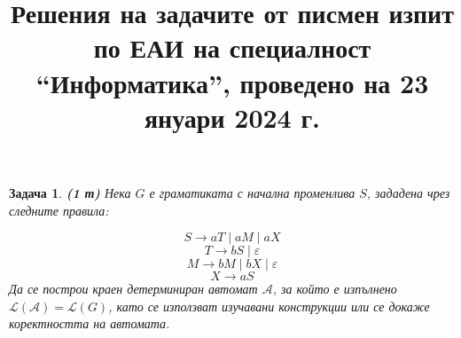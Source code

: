 \documentclass{article}
\newtheorem{problem}{Задача}
\theoremstyle{definition}
\begin{document}
\title{Решения на задачите от писмен изпит по ЕАИ на специалност ``Информатика'', проведено на 23 януари 2024 г.}
\date{}

\maketitle

\begin{problem} {\bf (1 т)} Нека $G$ е граматиката с начална променлива $S$, зададена чрез следните правила:

$$S \rightarrow aT \mid aM \mid aX$$
$$T \rightarrow bS \mid \varepsilon$$
$$M \rightarrow bM \mid bX \mid \varepsilon$$
$$X \rightarrow aS$$
Да се построи краен детерминиран автомат $\mathcal{A}$, за който е изпълнено $\mathcal{L}(\mathcal{A})=\mathcal{L}(G)$, като се използват изучавани конструкции или се докаже коректността на автомата.
\end{problem}
\end{document}
